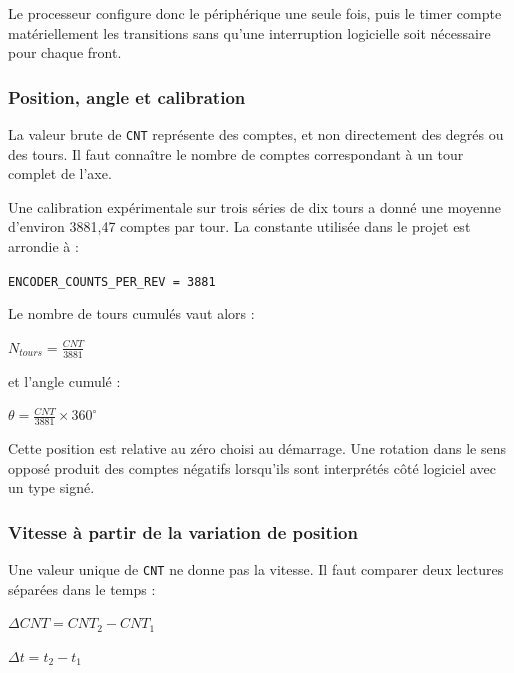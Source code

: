 \documentclass[11pt,a4paper]{article}
\begin{document}
	Le processeur configure donc le périphérique une seule fois, puis le timer compte matériellement les transitions sans qu'une interruption logicielle soit nécessaire pour chaque front.
	
	\subsubsection*{Position, angle et calibration}
	
	La valeur brute de \texttt{CNT} représente des comptes, et non directement des degrés ou des tours. Il faut connaître le nombre de comptes correspondant à un tour complet de l'axe.
	
	Une calibration expérimentale sur trois séries de dix tours a donné une moyenne d'environ 3881,47 comptes par tour. La constante utilisée dans le projet est arrondie à :
	
	\begin{center}
		\texttt{ENCODER\_COUNTS\_PER\_REV = 3881}
	\end{center}
	
	Le nombre de tours cumulés vaut alors :
	
	\begin{center}
		$N_{tours} = \frac{CNT}{3881}$
	\end{center}
	
	et l'angle cumulé :
	
	\begin{center}
		$\theta = \frac{CNT}{3881} \times 360^\circ$
	\end{center}
	
	Cette position est relative au zéro choisi au démarrage. Une rotation dans le sens opposé produit des comptes négatifs lorsqu'ils sont interprétés côté logiciel avec un type signé.
	
	\subsubsection*{Vitesse à partir de la variation de position}
	
	Une valeur unique de \texttt{CNT} ne donne pas la vitesse. Il faut comparer deux lectures séparées dans le temps :
	
	\begin{center}
		$\Delta CNT = CNT_2 - CNT_1$
	\end{center}
	
	\begin{center}
		$\Delta t = t_2 - t_1$
	\end{center}
	
\end{document}
